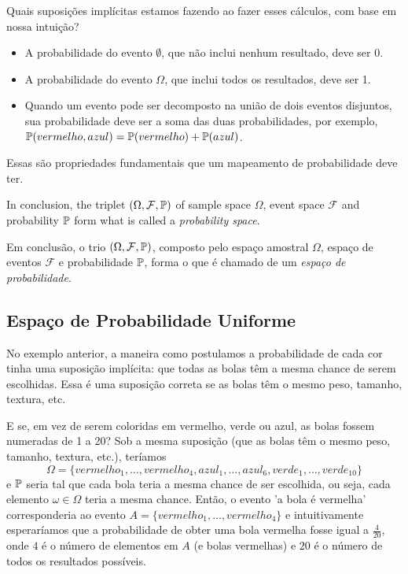 Quais suposições implícitas estamos fazendo ao fazer esses cálculos, com base em nossa intuição?

\begin{itemize}
\item A probabilidade do evento $\emptyset$, que não inclui nenhum resultado, deve ser 0.
\item A probabilidade do evento $\Omega$, que inclui todos os resultados, deve ser 1.
\item Quando um evento pode ser decomposto na união de dois eventos disjuntos, sua probabilidade deve ser a soma das duas probabilidades, por exemplo, $\mathbb{P}({vermelho, azul}) = \mathbb{P}({vermelho}) + \mathbb{P}({azul})$.
\end{itemize}

Essas são propriedades fundamentais que um mapeamento de probabilidade deve ter.

In conclusion, the triplet $(\Omega,\mathcal F,\mathbb{P})$ of sample space $\Omega$, event space $\mathcal{F}$ and probability $\mathbb{P}$ form what is called a \emph{probability space}.

Em conclusão, o trio $(\Omega, \mathcal{F}, \mathbb{P})$, composto pelo espaço amostral $\Omega$, espaço de eventos $\mathcal{F}$ e probabilidade $\mathbb{P}$, forma o que é chamado de um \emph{espaço de probabilidade}.

\subsection{Espaço de Probabilidade Uniforme}
\label{espaços de probabilidade uniforme}

No exemplo anterior, a maneira como postulamos a probabilidade de cada cor tinha uma suposição implícita: que todas as bolas têm a mesma chance de serem escolhidas. Essa é uma suposição correta se as bolas têm o mesmo peso, tamanho, textura, etc.

E se, em vez de serem coloridas em vermelho, verde ou azul, as bolas fossem numeradas de 1 a 20?
Sob a mesma suposição (que as bolas têm o mesmo peso, tamanho, textura, etc.), teríamos
$$\Omega=\{vermelho_1,\dots,vermelho_4, azul_1,\dots, azul_6, verde_1,\dots,verde_{10}\}$$ e $\mathbb{P}$ seria tal que cada bola teria a mesma chance de ser escolhida, ou seja, cada elemento $\omega \in \Omega$ teria a mesma chance. Então, o evento 'a bola é vermelha' corresponderia ao evento $A=\{vermelho_1,\dots,vermelho_4\}$ e intuitivamente esperaríamos que a probabilidade de obter uma bola vermelha fosse igual a $\frac{4}{20}$, onde $4$ é o número de elementos em $A$ (e bolas vermelhas) e $20$ é o número de todos os resultados possíveis.

